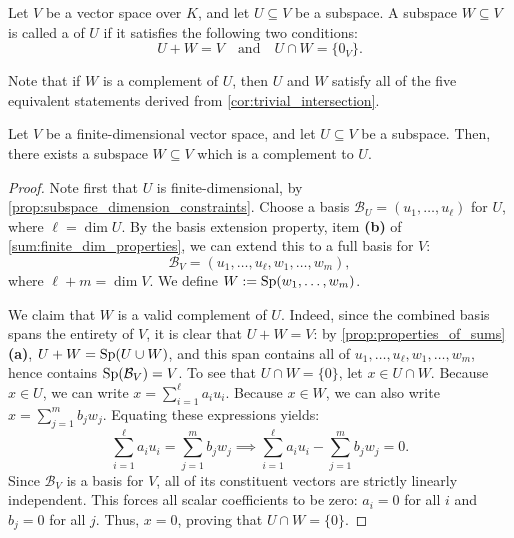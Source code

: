 \begin{definition}
\label{def:complement}
Let $V$ be a vector space over $K$, and let $U \subseteq V$ be a subspace. A subspace $W \subseteq V$ is called a  of $U$ if it satisfies the following two conditions:
\[
U + W = V \quad \text{and} \quad U \cap W = \{0_V\}.
\]
\end{definition}

\begin{remark}
Note that if $W$ is a complement of $U$, then $U$ and $W$ satisfy all of the five equivalent statements derived from \cref{cor:trivial_intersection}.
\end{remark}

\begin{proposition}
\label{prop:existence_complement}
Let $V$ be a finite-dimensional vector space, and let $U \subseteq V$ be a subspace. Then, there exists a subspace $W \subseteq V$ which is a complement to $U$.
\end{proposition}

\begin{proof}
Note first that $U$ is finite-di\-men\-sional, by \cref{prop:subspace_dimension_constraints}. Choose a basis $\mathcal{B}_U = (u_1, \dots, u_{\ell})$ for $U$, where $\ell = \dim U$. By the basis extension property, item \textbf{(b)} of \cref{sum:finite_dim_properties}, we can extend this to a full basis for $V$:
\[
\mathcal{B}_V = (u_1, \dots, u_{\ell}, w_1, \dots, w_m),
\]
where $\ell + m = \dim V$. We define $W := \operatorname{Sp}(w_1, \dots, w_m)$. 

We claim that $W$ is a valid complement of $U$. Indeed, since the combined basis spans the entirety of $V$, it is clear that $U + W = V$: by \cref{prop:properties_of_sums} \textbf{(a)}, $U + W = \operatorname{Sp}(U \cup W)$, and this span contains all of $u_1, \dots, u_{\ell}, w_1, \dots, w_m$, hence contains $\operatorname{Sp}(\mathcal{B}_V) = V$. To see that $U \cap W = \{0\}$, let $x \in U \cap W$. Because $x \in U$, we can write $x = \sum_{i=1}^{\ell} a_i u_i$. Because $x \in W$, we can also write $x = \sum_{j=1}^m b_j w_j$. Equating these expressions yields:
\[
\sum_{i=1}^{\ell} a_i u_i = \sum_{j=1}^m b_j w_j \implies \sum_{i=1}^{\ell} a_i u_i - \sum_{j=1}^m b_j w_j = 0.
\]
Since $\mathcal{B}_V$ is a basis for $V$, all of its constituent vectors are strictly linearly independent. This forces all scalar coefficients to be zero: $a_i = 0$ for all $i$ and $b_j = 0$ for all $j$. Thus, $x = 0$, proving that $U \cap W = \{0\}$.
\end{proof}

